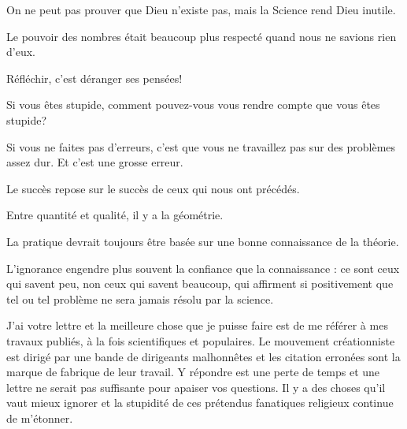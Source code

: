  	 \begin{fquote}On ne peut pas prouver que Dieu n'existe pas, mais la Science rend Dieu inutile.
 	\end{fquote}

 	 \begin{fquote}[Voltaire]Le pouvoir des nombres était beaucoup plus respecté quand nous ne savions rien d'eux.
 	\end{fquote}

	\begin{fquote}Réfléchir, c'est déranger ses pensées!
 	\end{fquote} 
 	
 	\begin{fquote}Si vous êtes stupide, comment pouvez-vous vous rendre compte que vous êtes stupide?
 	\end{fquote} 	
 	
 	\begin{fquote}Si vous ne faites pas d'erreurs, c'est que vous ne travaillez pas sur des problèmes assez dur. Et c'est une grosse erreur.
 	\end{fquote}

	\begin{fquote}[?]Le succès repose sur le succès de ceux qui nous ont précédés.
 	\end{fquote}
 	
 	\begin{fquote}Entre quantité et qualité, il y a la géométrie.
 	\end{fquote}

	\begin{fquote}La pratique devrait toujours être basée sur une bonne connaissance de la théorie.
 	\end{fquote}
 	
 	\begin{fquote}L'ignorance engendre plus souvent la confiance que la connaissance : ce sont ceux qui savent peu, non ceux qui savent beaucoup, qui affirment si positivement que tel ou tel problème ne sera jamais résolu par la science.
 	\end{fquote}
 	
 	\begin{fquote}J'ai votre lettre et la meilleure chose que je puisse faire est de me référer à mes travaux publiés, à la fois scientifiques et populaires. Le mouvement créationniste est dirigé par une bande de dirigeants malhonnêtes et les citation erronées sont la marque de fabrique de leur travail. Y répondre est une perte de temps et une lettre ne serait pas suffisante pour apaiser vos questions. Il y a des choses qu'il vaut mieux ignorer et la stupidité de ces prétendus fanatiques religieux continue de m'étonner.
 	\end{fquote}
 	
